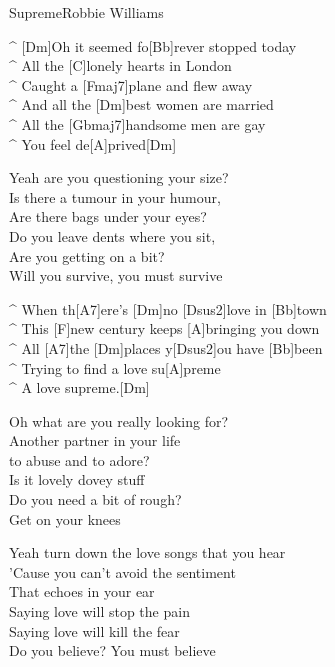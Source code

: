 \begin{song}{Supreme}{Robbie Williams}

\begin{guitar}
^ [Dm]Oh it seemed fo[Bb]rever stopped today\\
^ All the [C]lonely hearts in London\\
^ Caught a [Fmaj7]plane and flew away\\
^ And all the [Dm]best women are married\\
^ All the [Gbmaj7]handsome men are gay\\
^ You feel de[A]prived[Dm]\\
\end{guitar}

\begin{guitar}
Yeah are you questioning your size?\\
Is there a tumour in your humour,\\
Are there bags under your eyes?\\
Do you leave dents where you sit,\\
Are you getting on a bit?\\
Will you survive, you must survive\\
\end{guitar}

\begin{guitar}
^ When th[A7]ere's [Dm]no [Dsus2]love in [Bb]town \\
^ This [F]new century keeps [A]bringing you down\\
^ All [A7]the [Dm]places y[Dsus2]ou have [Bb]been \\
^ Trying to find a love su[A]preme\\
^ A love supreme.[Dm]\\
\end{guitar}

\begin{guitar}
Oh what are you really looking for?\\
Another partner in your life\\
to abuse and to adore?\\
Is it lovely dovey stuff\\
Do you need a bit of rough?\\
Get on your knees\\
\end{guitar}

\begin{guitar}
Yeah turn down the love songs that you hear\\
'Cause you can't avoid the sentiment\\
That echoes in your ear\\
Saying love will stop the pain \\
Saying love will kill the fear\\
Do you believe? You must believe\\
\end{guitar}


\end{song}
